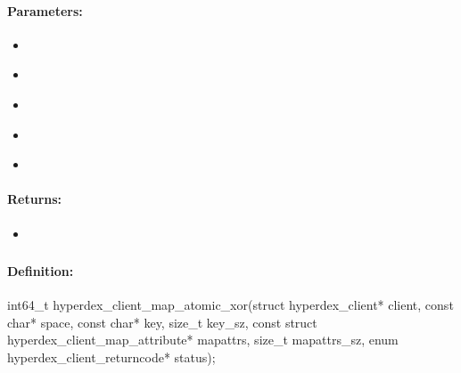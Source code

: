 \paragraph{Parameters:}
\begin{itemize}[noitemsep]
\item {}\\

\item {}\\

\item {}\\

\item {}\\

\item {}\\

\end{itemize}

\paragraph{Returns:}
\begin{itemize}[noitemsep]
\item {}\\

\end{itemize}

\pagebreak
\subsubsection{}
\label{api:c:map_atomic_xor}


\paragraph{Definition:}
\begin{ccode}
int64_t hyperdex_client_map_atomic_xor(struct hyperdex_client* client,
        const char* space,
        const char* key, size_t key_sz,
        const struct hyperdex_client_map_attribute* mapattrs, size_t mapattrs_sz,
        enum hyperdex_client_returncode* status);
\end{ccode}


